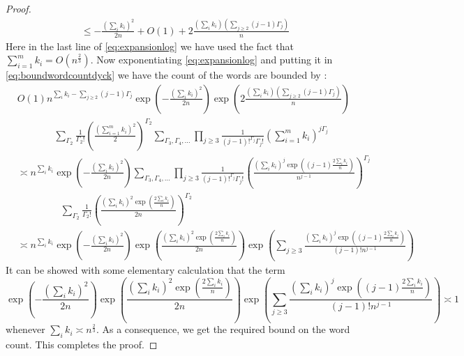\documentclass[12pt]{article}
\numberwithin{equation}{section}
\numberwithin{equation}{section}
\theoremstyle{definition}
\renewcommand{\1}{\bf 1}
\begin{document}
\begin{proof}
\begin{equation}
\begin{split}
&\le - \frac{\left(\sum_{i}k_{i}\right)^2}{2n}+O(1) + 2\frac{\left( \sum_{i}k_{i} \right)\left(\sum_{j\ge 2}(j-1)\Gamma_{j}\right) }{n}
\end{split}
\end{equation}
Here in the last line of \eqref{eq:expansionlog} we have used the fact that $\sum_{i=1}^{m}k_{i}=O(n^{\frac{2}{3}})$. Now exponentiating \eqref{eq:expansionlog} and putting it in \eqref{eq:boundwordcountdyck} we have the count of the words are bounded by :
\begin{equation}\label{eq:boundwordcountdyckII}
\begin{split}
&O(1)n^{\sum_{i}k_{i}- \sum_{j\ge 2}(j-1)\Gamma_{j}}\exp\left(  - \frac{\left(\sum_{i}k_{i}\right)^2}{2n} \right) \exp\left( 2\frac{\left( \sum_{i}k_{i} \right)\left(\sum_{j\ge 2}(j-1)\Gamma_{j}\right) }{n} \right)\\
&~~~~~~~~~~~~~~~~~\sum_{\Gamma_{2}}\frac{1}{\Gamma_{2}!}\left( \frac{\left(\sum_{i=1}^{m}k_{i}\right)^{2}}{2} \right)^{\Gamma_{2}}\sum_{\Gamma_{3},\Gamma_{4},\ldots} \prod_{j\ge 3}\frac{1}{(j-1)!^{\Gamma_{j}}\Gamma_{j}!}\left( \sum_{i=1}^{m} k_{i} \right)^{j\Gamma_{j}}\\
& \asymp n^{\sum_{i}k_{i}} \exp\left(  - \frac{\left(\sum_{i}k_{i}\right)^2}{2n} \right) \sum_{\Gamma_{3},\Gamma_{4},\ldots} \prod_{j\ge 3} \frac{1}{(j-1)!^{\Gamma_{j}}\Gamma_{j}!}\left(\frac{\left(\sum_{i}k_{i}\right)^{j}\exp\left((j-1) \frac{2\sum_{i}k_{i}}{n} \right)}{n^{j-1}}\right)^{\Gamma_{j}}\\
&~~~~~~~~~~~~~~~~~~~~ \sum_{\Gamma_{2}} \frac{1}{\Gamma_{2}!}\left( \frac{\left(\sum_{i}k_{i}\right)^2\exp\left( \frac{2\sum_i{k_{i}}}{n} \right)}{2n} \right)^{\Gamma_{2}}\\
&\asymp  n^{\sum_{i}k_{i}} \exp\left(  - \frac{\left(\sum_{i}k_{i}\right)^2}{2n} \right)\exp \left(  \frac{\left(\sum_{i}k_{i}\right)^{2}\exp\left( \frac{2\sum_i{k_{i}}}{n} \right)}{2n}\right)\exp\left( \sum_{j\ge 3} \frac{\left(\sum_{i}k_{i}\right)^{j}\exp\left((j-1) \frac{2\sum_{i}k_{i}}{n} \right)}{(j-1)!n^{j-1}} \right)
\end{split}
\end{equation}
It can be showed with some elementary calculation that the term 
\begin{equation}
\exp\left(  - \frac{\left(\sum_{i}k_{i}\right)^2}{2n} \right)\exp \left(  \frac{\left(\sum_{i}k_{i}\right)^{2}\exp\left( \frac{2\sum_i{k_{i}}}{n} \right)}{2n}\right)\exp\left( \sum_{j\ge 3} \frac{\left(\sum_{i}k_{i}\right)^{j}\exp\left((j-1) \frac{2\sum_{i}k_{i}}{n} \right)}{(j-1)!n^{j-1}} \right) \asymp 1
\end{equation}
whenever $\sum_{i}k_{i}\asymp n^{\frac{2}{3}}$. As a consequence, we get the required bound on the word count. This completes the proof.
\end{proof}
\end{document}
